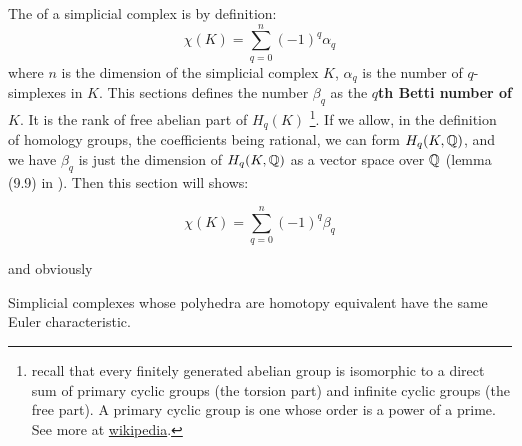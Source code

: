 The  of a simplicial complex is by
definition:
\begin{equation}
    \chi(K)=\sum_{q=0}^n (-1)^q \alpha_q
\end{equation}
where $n$ is the dimension of the simplicial complex $K$, $\alpha_q$ is the
number of $q$-simplexes in $K$. This sections defines the number $\beta_q$ as
the \textbf{$q$th Betti number of $K$}. It is the rank of free abelian part of $H_q(K)$
\footnote{
    recall that every finitely generated abelian group is isomorphic to a direct
    sum of primary cyclic groups (the torsion part) and infinite cyclic groups
    (the free part). A primary cyclic group is one whose order is a power of a
    prime. See more at
    \href{https://en.wikipedia.org/wiki/Finitely_generated_abelian_group}{wikipedia}.
}. If we allow, in the definition of homology groups, the coefficients being
rational, we can form $H_q(K,\mathbb{Q})$, and we have $\beta_q$ is just the dimension
of $H_q(K,\mathbb{Q})$ as a vector space over $\mathbb{Q}$ (lemma (9.9) in \cite{book}). Then
this section will shows:
\begin{thm}
\begin{equation}
    \chi(K)=\sum_{q=0}^n (-1)^q \beta_q
\end{equation}
\end{thm}
and obviously
\begin{coro}
    Simplicial complexes whose polyhedra are homotopy equivalent have the same
    Euler characteristic.
\end{coro}


